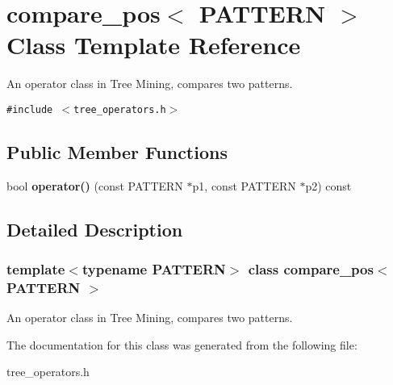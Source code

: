 \section{compare\_\-pos$<$ PATTERN $>$ Class Template Reference}
\label{classcompare__pos}
An operator class in Tree Mining, compares two patterns.  


{\tt \#include $<$tree\_\-operators.h$>$}

\subsection*{Public Member Functions}
\begin{CompactItemize}
\item 
bool \textbf{operator()} (const PATTERN $\ast$p1, const PATTERN $\ast$p2) const \label{classcompare__pos_16079fec60328fa31509e03053e5349f}

\end{CompactItemize}


\subsection{Detailed Description}
\subsubsection*{template$<$typename PATTERN$>$ class compare\_\-pos$<$ PATTERN $>$}

An operator class in Tree Mining, compares two patterns. 



The documentation for this class was generated from the following file:\begin{CompactItemize}
\item 
tree\_\-operators.h\end{CompactItemize}
